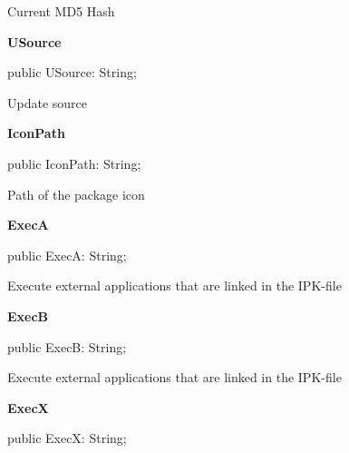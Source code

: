 \documentclass{report}
\newif\ifpdf
\begin{document}
\begin{list}{}
\begin{flushleft}
\ifpdf
\end{flushleft}
\fi


\par Current MD5 Hash\label{mainunit.TIWizFrm-USource}
\item[\textbf{USource}\hfill]
\ifpdf
\begin{flushleft}
\fi
\begin{ttfamily}
public USource: String;\end{ttfamily}

\ifpdf
\end{flushleft}
\fi


\par Update source\label{mainunit.TIWizFrm-IconPath}
\item[\textbf{IconPath}\hfill]
\ifpdf
\begin{flushleft}
\fi
\begin{ttfamily}
public IconPath: String;\end{ttfamily}

\ifpdf
\end{flushleft}
\fi


\par Path of the package icon\label{mainunit.TIWizFrm-ExecA}
\item[\textbf{ExecA}\hfill]
\ifpdf
\begin{flushleft}
\fi
\begin{ttfamily}
public ExecA: String;\end{ttfamily}

\ifpdf
\end{flushleft}
\fi


\par Execute external applications that are linked in the IPK{-}file\label{mainunit.TIWizFrm-ExecB}
\item[\textbf{ExecB}\hfill]
\ifpdf
\begin{flushleft}
\fi
\begin{ttfamily}
public ExecB: String;\end{ttfamily}

\ifpdf
\end{flushleft}
\fi


\par Execute external applications that are linked in the IPK{-}file\label{mainunit.TIWizFrm-ExecX}
\item[\textbf{ExecX}\hfill]
\ifpdf
\begin{flushleft}
\fi
\begin{ttfamily}
public ExecX: String;\end{ttfamily}


\end{flushleft}
\end{list}
\end{document}
